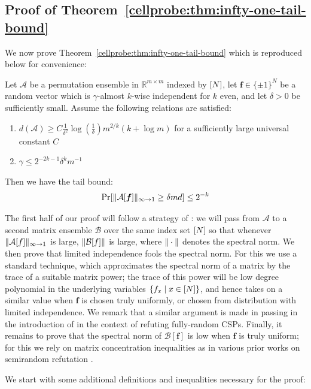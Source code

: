 \subsection{Proof of Theorem~\ref{cellprobe:thm:infty-one-tail-bound}}\label{cellprobe:subsec:infty-to-one-tail}
We now prove Theorem~\ref{cellprobe:thm:infty-one-tail-bound} which is reproduced below for convenience:
\begin{theorem*}
Let $\mathcal{A}$ be a permutation ensemble in $\mathbb{R}^{m \times m}$ indexed by $[N]$, let $\bm{f} \in \{\pm 1\}^N$ be a random vector which is $\gamma$-almost $k$-wise independent for $k$ even, and let $\delta > 0$ be sufficiently small. Assume the following relations are satisfied:
\begin{enumerate}
	\item $d(\mathcal{A})\geq   C\frac{1}{\delta^2} \log(\frac{1}{\delta}) m^{2/k}(k+\log m )$ for a sufficiently large universal constant $C$
	\item $\gamma \leq 2^{-2k-1}\delta^km^{-1}$ 
\end{enumerate}
Then we have the tail bound:
\[
\Pr[\Vert \mathcal{A}[\bm{f}] \Vert_{\infty \to 1} \geq \delta m d] \leq 2^{-k}
\]
\end{theorem*}
The first half of our proof will follow a strategy of \cite{simpler-moore}: we will pass from $\mathcal{A}$ to a second matrix ensemble $\mathcal{B}$ over the same index set $[N]$ so that whenever $\Vert \mathcal{A}[f] \Vert_{\infty\to 1}$ is large, $\Vert \mathcal{B}[f] \Vert$ is large, where $\Vert \cdot \Vert$ denotes the spectral norm. We then prove that limited independence fools the spectral norm. For this we use a standard technique, which approximates the spectral norm of a matrix by the trace of a suitable matrix power; the trace of this power will be low degree polynomial in the underlying variables $\{f_x \mid x \in [N]\}$, and hence takes on a similar value when $\bm{f}$ is chosen truly uniformly, or chosen from distribution with limited independence. We remark that a similar argument is made in passing in the introduction of \cite{luca} in the context of refuting fully-random CSPs. Finally, it remains to prove that the spectral norm of $\mathcal{B}[\bm{f}]$ is low when $\bm{f}$ is truly uniform; for this we rely on matrix concentration inequalities as in various prior works on semirandom refutation \cite{semirandom,smoothed}.

We start with some additional definitions and inequalities necessary for the proof:

